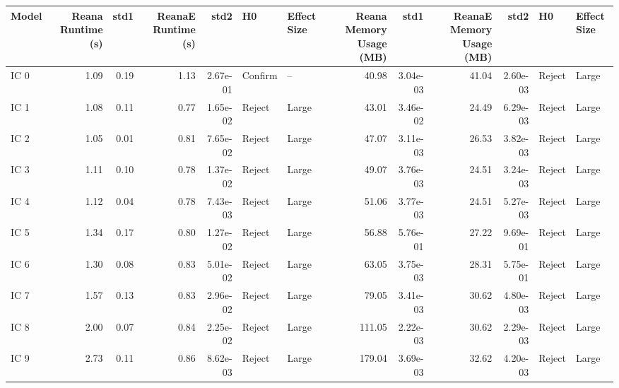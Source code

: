 \begin{tabular}{lrrrrllrrrrll}
\toprule
 Model &  Reana Runtime (s) &   std1 &  ReanaE Runtime (s) &      std2 &       H0 & Effect Size &  Reana Memory Usage (MB) &      std1 &  ReanaE Memory Usage (MB) &      std2 &      H0 & Effect Size \\
\midrule
  IC 0 &               1.09 &   0.19 &                1.13 &  2.67e-01 &  Confirm &          -- &                    40.98 &  3.04e-03 &                     41.04 &  2.60e-03 &  Reject &       Large \\
  IC 1 &               1.08 &   0.11 &                0.77 &  1.65e-02 &   Reject &       Large &                    43.01 &  3.46e-02 &                     24.49 &  6.29e-03 &  Reject &       Large \\
  IC 2 &               1.05 &   0.01 &                0.81 &  7.65e-02 &   Reject &       Large &                    47.07 &  3.11e-03 &                     26.53 &  3.82e-03 &  Reject &       Large \\
  IC 3 &               1.11 &   0.10 &                0.78 &  1.37e-02 &   Reject &       Large &                    49.07 &  3.76e-03 &                     24.51 &  3.24e-03 &  Reject &       Large \\
  IC 4 &               1.12 &   0.04 &                0.78 &  7.43e-03 &   Reject &       Large &                    51.06 &  3.77e-03 &                     24.51 &  5.27e-03 &  Reject &       Large \\
  IC 5 &               1.34 &   0.17 &                0.80 &  1.27e-02 &   Reject &       Large &                    56.88 &  5.76e-01 &                     27.22 &  9.69e-01 &  Reject &       Large \\
  IC 6 &               1.30 &   0.08 &                0.83 &  5.01e-02 &   Reject &       Large &                    63.05 &  3.75e-03 &                     28.31 &  5.75e-01 &  Reject &       Large \\
  IC 7 &               1.57 &   0.13 &                0.83 &  2.96e-02 &   Reject &       Large &                    79.05 &  3.41e-03 &                     30.62 &  4.80e-03 &  Reject &       Large \\
  IC 8 &               2.00 &   0.07 &                0.84 &  2.25e-02 &   Reject &       Large &                   111.05 &  2.22e-03 &                     30.62 &  2.29e-03 &  Reject &       Large \\
  IC 9 &               2.73 &   0.11 &                0.86 &  8.62e-03 &   Reject &       Large &                   179.04 &  3.69e-03 &                     32.62 &  4.20e-03 &  Reject &       Large \\

\end{tabular}
